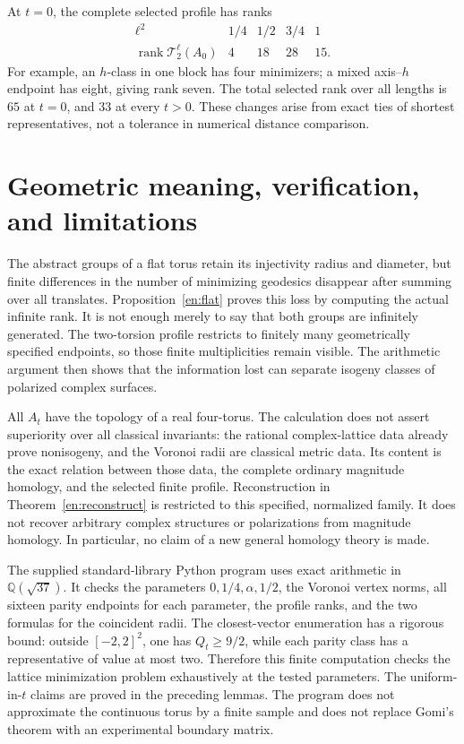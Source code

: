 \documentclass[12pt]{amsart}
\theoremstyle{definition}
\theoremstyle{remark}
\numberwithin{equation}{section}
\newcommand{\rank}{\operatorname{rank}}
\newcommand{\Q}{\mathbb{Q}}
\begin{document}
At $t=0$, the complete selected profile has ranks
\begin{equation}\label{en:zeroprofile}
\begin{array}{c|cccc}
\ell^2&1/4&1/2&3/4&1\\\hline
\rank\mathcal T_2^\ell(A_0)&4&18&28&15.
\end{array}
\end{equation}
For example, an $h$-class in one block has four minimizers; a mixed axis--$h$ endpoint has eight, giving rank seven. The total selected rank over all lengths is $65$ at $t=0$, and $33$ at every $t>0$. These changes arise from exact ties of shortest representatives, not a tolerance in numerical distance comparison.

\section{Geometric meaning, verification, and limitations}
The abstract groups of a flat torus retain its injectivity radius and diameter, but finite differences in the number of minimizing geodesics disappear after summing over all translates. Proposition~\ref{en:flat} proves this loss by computing the actual infinite rank. It is not enough merely to say that both groups are infinitely generated. The two-torsion profile restricts to finitely many geometrically specified endpoints, so those finite multiplicities remain visible. The arithmetic argument then shows that the information lost can separate isogeny classes of polarized complex surfaces.

All $A_t$ have the topology of a real four-torus. The calculation does not assert superiority over all classical invariants: the rational complex-lattice data already prove nonisogeny, and the Voronoi radii are classical metric data. Its content is the exact relation between those data, the complete ordinary magnitude homology, and the selected finite profile. Reconstruction in Theorem~\ref{en:reconstruct} is restricted to this specified, normalized family. It does not recover arbitrary complex structures or polarizations from magnitude homology. In particular, no claim of a new general homology theory is made.

The supplied standard-library Python program uses exact arithmetic in $\Q(\sqrt{37})$. It checks the parameters $0,1/4,\alpha,1/2$, the Voronoi vertex norms, all sixteen parity endpoints for each parameter, the profile ranks, and the two formulas for the coincident radii. The closest-vector enumeration has a rigorous bound: outside $[-2,2]^2$, one has $Q_t\geq9/2$, while each parity class has a representative of value at most two. Therefore this finite computation checks the lattice minimization problem exhaustively at the tested parameters. The uniform-in-$t$ claims are proved in the preceding lemmas. The program does not approximate the continuous torus by a finite sample and does not replace Gomi's theorem with an experimental boundary matrix.
\end{document}
